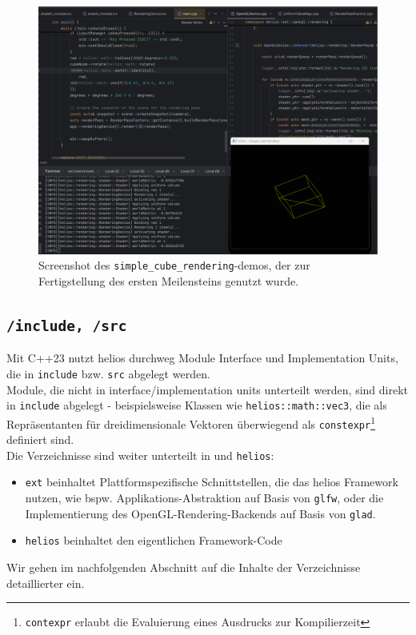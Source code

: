 \begin{figure}[!h]
    \centering
    \includegraphics[width=1\columnwidth]{img/cube_example}
    \caption{Screenshot des \texttt{simple\_cube\_rendering}-demos, der zur Fertigstellung des ersten Meilensteins genutzt wurde.}
    \label{fig:simple-cube-rendering-demo}
\end{figure}

\subsection*{\texttt{/include, /src}}
Mit C++23 nutzt helios durchweg Module Interface und Implementation Units, die in \texttt{include} bzw. \texttt{src} abgelegt werden.\\
Module, die nicht in interface/implementation units unterteilt werden, sind direkt in \texttt{include} abgelegt - beispielsweise Klassen wie \texttt{helios::math::vec3}, die als Repräsentanten für dreidimensionale Vektoren überwiegend als \texttt{constexpr}\footnote{
\texttt{contexpr} erlaubt die Evaluierung eines Ausdrucks zur Kompilierzeit
} definiert sind.\\
Die Verzeichnisse sind weiter unterteilt in  und \texttt{helios}:
\begin{itemize}
    \itemsep0.5em
    \item \texttt{ext} beinhaltet Plattformspezifische Schnittstellen, die das helios Framework nutzen, wie bspw. Applikations-Abstraktion auf Basis von \texttt{glfw}, oder die Implementierung des OpenGL-Rendering-Backends auf Basis von \texttt{glad}.
    \item \texttt{helios} beinhaltet den eigentlichen Framework-Code
\end{itemize}

Wir gehen im nachfolgenden Abschnitt auf die Inhalte der Verzeichnisse detaillierter ein.